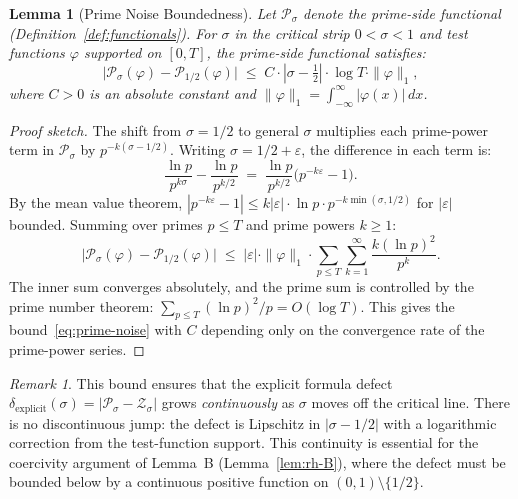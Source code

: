 \documentclass[11pt]{article}
\newtheorem{lemma}[theorem]{Lemma}
\theoremstyle{remark}
\newtheorem{remark}[theorem]{Remark}
\begin{document}
\begin{lemma}[Prime Noise Boundedness]
\label{lem:prime-noise}
Let $\mathcal{P}_\sigma$ denote the prime-side functional
(Definition~\ref{def:functionals}).
For $\sigma$ in the critical strip $0 < \sigma < 1$ and test functions
$\varphi$ supported on $[0, T]$, the prime-side functional satisfies:
\begin{equation}\label{eq:prime-noise}
  \bigl|\mathcal{P}_\sigma(\varphi) - \mathcal{P}_{1/2}(\varphi)\bigr|
  \;\leq\;
  C \cdot |\sigma - \tfrac{1}{2}| \cdot \log T \cdot \|\varphi\|_1,
\end{equation}
where $C > 0$ is an absolute constant and $\|\varphi\|_1 = \int_{-\infty}^{\infty}
|\varphi(x)|\,dx$.
\end{lemma}

\begin{proof}[Proof sketch]
The shift from $\sigma = 1/2$ to general $\sigma$ multiplies each prime-power
term in $\mathcal{P}_\sigma$ by $p^{-k(\sigma - 1/2)}$.
Writing $\sigma = 1/2 + \varepsilon$, the difference in each term is:
\[
  \frac{\ln p}{p^{k\sigma}} - \frac{\ln p}{p^{k/2}}
  \;=\;
  \frac{\ln p}{p^{k/2}} \bigl(p^{-k\varepsilon} - 1\bigr).
\]
By the mean value theorem, $|p^{-k\varepsilon} - 1| \leq k|\varepsilon| \cdot
\ln p \cdot p^{-k\min(\sigma, 1/2)}$ for $|\varepsilon|$ bounded.
Summing over primes $p \leq T$ and prime powers $k \geq 1$:
\[
  \bigl|\mathcal{P}_\sigma(\varphi) - \mathcal{P}_{1/2}(\varphi)\bigr|
  \;\leq\;
  |\varepsilon| \cdot \|\varphi\|_1 \cdot \sum_{p \leq T} \sum_{k=1}^{\infty}
    \frac{k(\ln p)^2}{p^{k}} .
\]
The inner sum converges absolutely, and the prime sum is controlled by the prime
number theorem: $\sum_{p \leq T} (\ln p)^2 / p = O(\log T)$.
This gives the bound~\eqref{eq:prime-noise} with $C$ depending only on the
convergence rate of the prime-power series.
\end{proof}

\begin{remark}
This bound ensures that the explicit formula defect
$\delta_{\mathrm{explicit}}(\sigma) = |\mathcal{P}_\sigma - \mathcal{Z}_\sigma|$
grows \emph{continuously} as $\sigma$ moves off the critical line.
There is no discontinuous jump: the defect is Lipschitz in $|\sigma - 1/2|$
with a logarithmic correction from the test-function support.
This continuity is essential for the coercivity argument of Lemma~B
(Lemma~\ref{lem:rh-B}), where the defect must be bounded below by a continuous
positive function on $(0,1)\setminus\{1/2\}$.
\end{remark}
\end{document}
